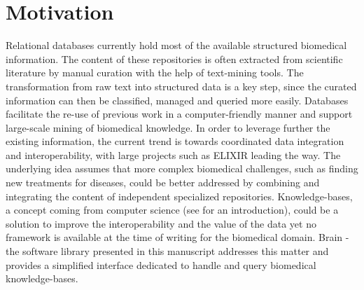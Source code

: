 \documentclass{bioinfo}
\begin{document}
\section{Motivation}
Relational databases currently hold most of the available structured biomedical information. The content of these repositories is often
extracted from scientific literature by manual curation with the help of text-mining tools. The transformation from raw text into
structured data is a key step, since the curated information can then be classified, managed and queried more easily. Databases facilitate
the re-use of previous work in a computer-friendly manner and support large-scale mining of
biomedical knowledge. In order to leverage further 
the existing information, the current trend is towards coordinated data integration and interoperability, with large projects such as 
ELIXIR \citep{Crosswell2012} leading the way.
The underlying idea assumes that more complex biomedical challenges, such as finding new treatments for diseases, could be better 
addressed by combining and integrating the content of independent specialized repositories. 
Knowledge-bases, a concept coming from computer science (see \citealp{Krotzsch2012} for an introduction), 
could be a solution to improve the interoperability and the value of the data yet no framework is available at the time of writing for 
the biomedical domain. Brain - the software library presented in this manuscript addresses this matter and provides a simplified 
interface dedicated to handle and query biomedical knowledge-bases.
\end{document}
